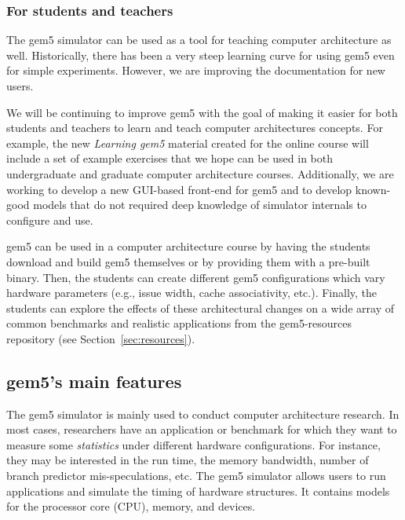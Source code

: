 \subsubsection{For students and teachers}

The gem5 simulator can be used as a tool for teaching computer architecture as well.
Historically, there has been a very steep learning curve for using gem5 even for simple experiments.
However, we are improving the documentation for new users.

We will be continuing to improve gem5 with the goal of making it easier for both students and teachers to learn and teach computer architectures concepts.
For example, the new \emph{Learning gem5} material created for the online course will include a set of example exercises that we hope can be used in both undergraduate and graduate computer architecture courses.
Additionally, we are working to develop a new GUI-based front-end for gem5 and to develop known-good models that do not required deep knowledge of simulator internals to configure and use.

gem5 can be used in a computer architecture course by having the students download and build gem5 themselves or by providing them with a pre-built binary.
Then, the students can create different gem5 configurations which vary hardware parameters (e.g., issue width, cache associativity, etc.).
Finally, the students can explore the effects of these architectural changes on a wide array of common benchmarks and realistic applications from the gem5-resources repository (see Section~\ref{sec:resources}).

\subsection{gem5's main features}
\label{sec:main-features}

The gem5 simulator is mainly used to conduct computer architecture research.
In most cases, researchers have an application or benchmark for which they want to measure some \emph{statistics} under different hardware configurations.
For instance, they may be interested in the run time, the memory bandwidth, number of branch predictor mis-speculations, etc.
The gem5 simulator allows users to run applications and simulate the timing of hardware structures.
It contains models for the processor core (CPU), memory, and devices.

